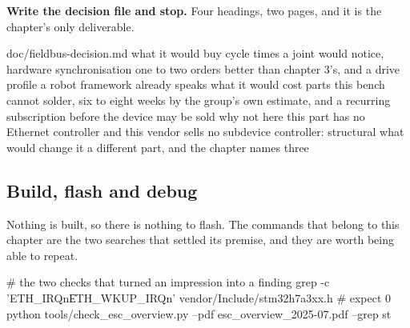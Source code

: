 \begin{steps}
\item \textbf{Write the decision file and stop.} Four headings, two pages, and
it is the chapter's only deliverable.
\begin{plaincode}
doc/fieldbus-decision.md
  what it would buy    cycle times a joint would notice, hardware
                       synchronisation one to two orders better than
                       chapter 3's, and a drive profile a robot framework
                       already speaks
  what it would cost   parts this bench cannot solder, six to eight weeks by
                       the group's own estimate, and a recurring
                       subscription before the device may be sold
  why not here         this part has no Ethernet controller and this vendor
                       sells no subdevice controller: structural
  what would change it a different part, and the chapter names three
\end{plaincode}
\end{steps}


\subsection*{Build, flash and debug}


Nothing is built, so there is nothing to flash. The commands that belong to this
chapter are the two searches that settled its premise, and they are worth being
able to repeat.

\begin{shellcode}
# the two checks that turned an impression into a finding
grep -c 'ETH_IRQn\|ETH_WKUP_IRQn' vendor/Include/stm32h7a3xx.h   # expect 0
python tools/check_esc_overview.py --pdf esc_overview_2025-07.pdf --grep st
\end{shellcode}

